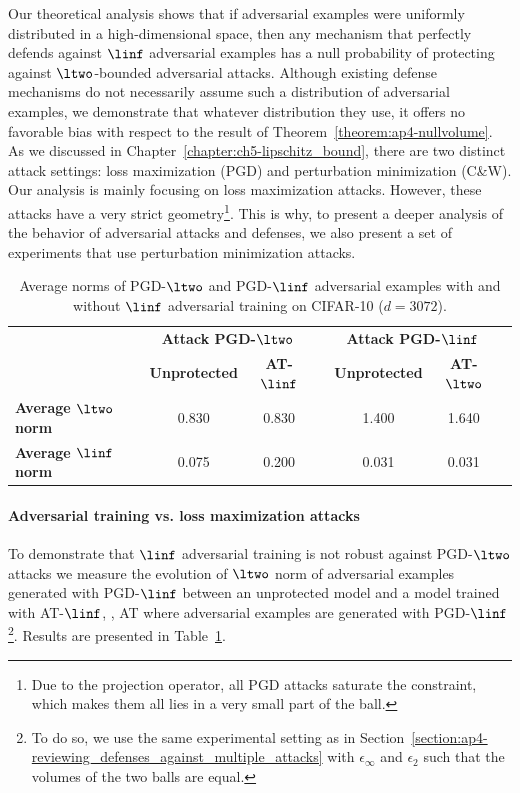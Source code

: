 Our theoretical analysis shows that if adversarial examples were uniformly distributed in a high-dimensional space, then any mechanism that perfectly defends against $\linf$ adversarial examples has a null probability of protecting against $\ltwo$-bounded adversarial attacks.
Although existing defense mechanisms do not necessarily assume such a distribution of adversarial examples, we demonstrate that whatever distribution they use, it offers no favorable bias with respect to the result of Theorem~\ref{theorem:ap4-nullvolume}.
As we discussed in Chapter~\ref{chapter:ch5-lipschitz_bound}, there are two distinct attack settings: loss maximization (PGD) and perturbation minimization (C\&W).
Our analysis is mainly focusing on loss maximization attacks.
However, these attacks have a very strict geometry\footnote{Due to the projection operator, all PGD attacks saturate the constraint, which makes them all lies in a very small part of the ball.}.
This is why, to present a deeper analysis of the behavior of adversarial attacks and defenses, we also present a set of experiments that use perturbation minimization attacks.

\begin{table}[htbp]
  \centering 
  \begin{tabular}{lccccccc}
    \toprule
    &  & \multicolumn{2}{c}{\textbf{Attack PGD-}$\ltwo$} & & \multicolumn{2}{c}{\textbf{Attack PGD-}$\linf$} \\
  \cmidrule{3-4} \cmidrule{6-7}
  &  & \textbf{Unprotected} & \textbf{AT-}$\linf$ & & \textbf{Unprotected} & \textbf{AT-}$\ltwo$ \\
    \midrule
    \textbf{Average $\ltwo$ norm} &   & 0.830 & 0.830 &   & 1.400 & 1.640 \\
    \textbf{Average $\linf$ norm} &   & 0.075 & 0.200 &   & 0.031 & 0.031 \\
    \bottomrule
  \end{tabular}%
  \caption{Average norms of PGD-$\ltwo$ and PGD-$\linf$ adversarial examples with and without $\linf$ adversarial training on CIFAR-10 ($d=3072$).}
  \label{table:ap4-mean_norm_pgd_attack}
\end{table}%

\paragraph{Adversarial training vs. loss maximization attacks}

To demonstrate that $\linf$ adversarial training is not robust against PGD-$\ltwo$ attacks we measure the evolution of $\ltwo$ norm of adversarial examples generated with PGD-$\linf$ between an unprotected model and a model trained with AT-$\linf$, \ie, AT where adversarial examples are generated with PGD-$\linf$ \footnote{To do so, we use the same experimental setting as in Section~\ref{section:ap4-reviewing_defenses_against_multiple_attacks} with $\epsilon_\infty$ and $\epsilon_2$ such that the volumes of the two balls are equal.}. 
Results are presented in  Table~\ref{table:ap4-mean_norm_pgd_attack}.

